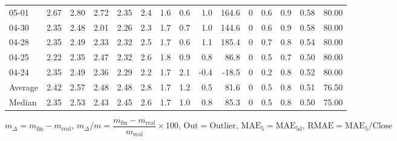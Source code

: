 \begin{threeparttable}
{\begin{tabular}{lrrrrrrrrrrrrrr}
  05-01 &          2.67 &          2.80 &          2.72 &        2.35 &                 2.4 &                1.6 &                 0.6 &        1.0 &        164.6 &              0 &                 0.6 &              0.9 &            0.58 &                  80.00 \\
  04-30 &          2.35 &          2.48 &          2.01 &        2.26 &                 2.3 &                1.7 &                 0.7 &        1.0 &        144.6 &              0 &                 0.6 &              0.9 &            0.58 &                  80.00 \\
  04-28 &          2.35 &          2.49 &          2.33 &        2.32 &                 2.5 &                1.7 &                 0.6 &        1.1 &        185.4 &              0 &                 0.7 &              0.8 &            0.54 &                  80.00 \\
  04-25 &          2.22 &          2.35 &          2.47 &        2.32 &                 2.6 &                1.8 &                 0.9 &        0.8 &         86.8 &              0 &                 0.5 &              0.7 &            0.50 &                  80.00 \\
  04-24 &          2.35 &          2.49 &          2.36 &        2.29 &                 2.2 &                1.7 &                 2.1 &       -0.4 &        -18.5 &              0 &                 0.2 &              0.8 &            0.52 &                  80.00 \\
Average &          2.42 &          2.57 &          2.48 &        2.48 &                 2.8 &                1.7 &                 1.2 &        0.5 &         81.6 &              0 &                 0.5 &              0.8 &            0.51 &                  76.50 \\
 Median &          2.35 &          2.53 &          2.43 &        2.45 &                 2.6 &                1.7 &                 1.0 &        0.8 &         85.3 &              0 &                 0.5 &              0.8 &            0.50 &                  75.00 \\
\bottomrule
\end{tabular}
}
\begin{tablenotes}\footnotesize
\item $m_\Delta=m_{\text{fin}}-m_{\text{real}}$,
$m_\Delta/m=\dfrac{m_{\text{fin}}-m_{\text{real}}}{m_{\text{real}}}\times100$,
$\mathrm{Out}=\text{Outlier}$,
$\mathrm{MAE}_5=\mathrm{MAE}_{5\text{d}}$,
$\mathrm{RMAE}=\mathrm{MAE}_5/\text{Close}$
\end{tablenotes}
\end{threeparttable}
\endgroup

